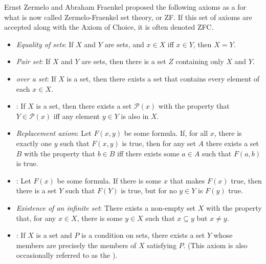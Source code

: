 \documentclass[12pt]{article}
\begin{document}
Ernst Zermelo and Abraham Fraenkel proposed the following axioms as a  for what is now called Zermelo-Fraenkel set theory, or ZF.  If this set of axioms are accepted along with the Axiom of Choice, it is often denoted ZFC.

\begin{itemize}
\item \emph{Equality of sets}: If $X$ and $Y$ are sets, and $x \in X$ iff $x \in Y$, then $X = Y$.
\item \emph{Pair set}: If $X$ and $Y$ are sets, then there is a set $Z$ containing only $X$ and $Y$.
\item \emph{ over a set}: If $X$ is a set, then there exists a set that contains every element of each $x \in X$.
\item \emph{}: If $X$ is a set, then there exists a set $\mathcal{P}(x)$ with the property that $Y \in \mathcal{P}(x)$ iff any element $y \in Y$ is also in $X$.
\item \emph{Replacement axiom}: Let $F(x,y)$ be some formula.  If, for all $x$, there is exactly one $y$ such that $F(x,y)$ is true, then for any set $A$ there exists a set $B$ with the property that $b \in B$ iff there exists some $a \in A$ such that $F(a,b)$ is true.
\item \emph{}: Let $F(x)$ be some formula.  If there is some $x$ that makes $F(x)$ true, then there is a set $Y$ such that $F(Y)$ is true, but for no $y \in Y$ is $F(y)$ true.
\item \emph{Existence of an infinite set}: There exists a non-empty set $X$ with the property that, for any $x \in X$, there is some $y \in X$ such that $x \subseteq y$ but $x \neq y$.
\item \emph{}:  If $X$ is a set and $P$ is a condition on sets, there exists a set $Y$ whose members are precisely the members of $X$ satisfying $P$.  (This axiom is also occasionally referred to as the \emph{}).
\end{itemize}
\end{document}
